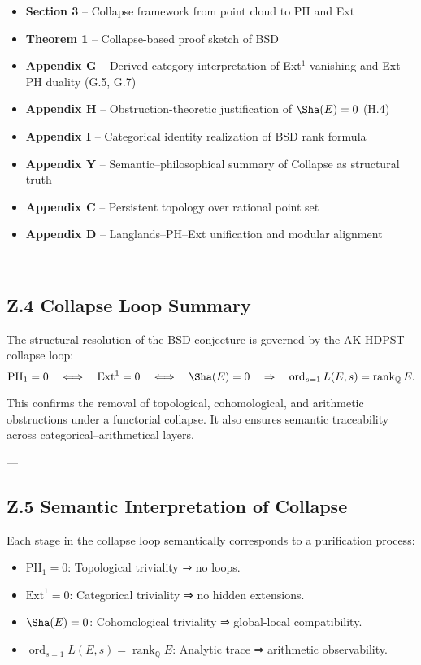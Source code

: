 \begin{itemize}
  \item \textbf{Section 3} – Collapse framework from point cloud to PH and Ext
  \item \textbf{Theorem 1} – Collapse-based proof sketch of BSD
  \item \textbf{Appendix G} – Derived category interpretation of Ext$^1$ vanishing and Ext–PH duality (G.5, G.7)
  \item \textbf{Appendix H} – Obstruction-theoretic justification of \( \Sha(E) = 0 \) (H.4)
  \item \textbf{Appendix I} – Categorical identity realization of BSD rank formula
  \item \textbf{Appendix Y} – Semantic–philosophical summary of Collapse as structural truth
  \item \textbf{Appendix C} – Persistent topology over rational point set
  \item \textbf{Appendix D} – Langlands–PH–Ext unification and modular alignment
\end{itemize}

---

\subsection*{Z.4 Collapse Loop Summary}

The structural resolution of the BSD conjecture is governed by the AK-HDPST collapse loop:
\[
\mathrm{PH}_1 = 0 
\quad \Longleftrightarrow \quad \mathrm{Ext}^1 = 0 
\quad \Longleftrightarrow \quad \Sha(E) = 0 
\quad \Rightarrow \quad \operatorname{ord}_{s=1} L(E,s) = \operatorname{rank}_\mathbb{Q} E.
\]

This confirms the removal of topological, cohomological, and arithmetic obstructions under a functorial collapse.  
It also ensures semantic traceability across categorical–arithmetical layers.

---

\subsection*{Z.5 Semantic Interpretation of Collapse}

Each stage in the collapse loop semantically corresponds to a purification process:

\begin{itemize}
  \item \( \mathrm{PH}_1 = 0 \): Topological triviality ⇒ no loops.
  \item \( \mathrm{Ext}^1 = 0 \): Categorical triviality ⇒ no hidden extensions.
  \item \( \Sha(E) = 0 \): Cohomological triviality ⇒ global-local compatibility.
  \item \( \operatorname{ord}_{s=1} L(E,s) = \operatorname{rank}_\mathbb{Q} E \): Analytic trace ⇒ arithmetic observability.
\end{itemize}

